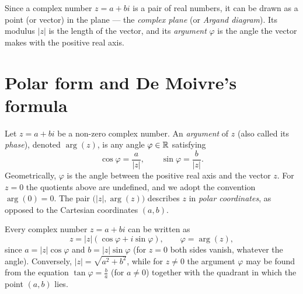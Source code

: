 Since a complex number $z=a+bi$ is a pair of real numbers, it can be drawn as a point (or vector) in the
plane — the \emph{complex plane} (or \emph{Argand diagram}). Its modulus $|z|$ is the length of the vector,
and its \emph{argument} $\varphi$ is the angle the vector makes with the positive real axis.

\begin{center}
\end{center}

\section{Polar form and De Moivre's formula}

\begin{definition}
Let $z=a+bi$ be a non-zero complex number. An \emph{argument} of $z$ (also called its \emph{phase}), denoted
$\arg(z)$, is any angle $\varphi\in\mathbb{R}$ satisfying
\[
\cos\varphi = \frac{a}{|z|}, \qquad \sin\varphi = \frac{b}{|z|}.
\]
Geometrically, $\varphi$ is the angle between the positive real axis and the vector $z$. For $z=0$ the
quotients above are undefined, and we adopt the convention $\arg(0)=0$. The pair $\big(|z|,\arg(z)\big)$
describes $z$ in \emph{polar coordinates}, as opposed to the Cartesian coordinates $(a,b)$.
\end{definition}

\begin{theorem}
Every complex number $z=a+bi$ can be written as
\[
z=|z|\left(\cos \varphi + i\sin \varphi \right), \qquad \varphi = \arg(z),
\]
since $a = |z|\cos\varphi$ and $b = |z|\sin\varphi$ (for $z=0$ both sides vanish, whatever the angle).
Conversely, $|z| = \sqrt{a^2+b^2}$, while for $z\neq 0$ the argument $\varphi$ may be found from the equation
$\tan\varphi= \tfrac{b}{a}$ (for $a \neq 0$) together with the quadrant in which the point $(a,b)$ lies.
\end{theorem}

